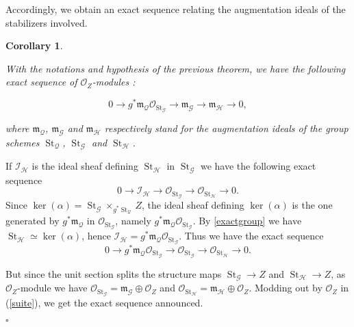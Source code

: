 \documentclass{amsart}
\newenvironment{demo}{{\flushleft \bf Proof~:}}{\hfill $\square$ \vspace{5mm}}
\newtheorem{coro}{Corollary}[section]
\theoremstyle{definition}
\theoremstyle{remark}
\begin{document}
Accordingly, we obtain an exact sequence relating the augmentation ideals of the stabilizers involved. 

\begin{coro}

\label{exactmodule}

With the notations and hypothesis of the previous theorem, we have the following exact sequence of ${{\mathcal O}}_Z$-modules : 

\[ 0 {\longrightarrow} g^*{{\mathfrak m}}_{{\mathcal Q}} {{\mathcal O}}_{\operatorname{St}_{{\mathcal G}}} {\longrightarrow} {{\mathfrak m}}_{{\mathcal G}} {\longrightarrow} {{\mathfrak m}}_{{\mathcal H}} {\longrightarrow} 0, \]

where ${{\mathfrak m}}_{{\mathcal Q}}$, ${{\mathfrak m}}_{{\mathcal G}}$ and ${{\mathfrak m}}_{{\mathcal H}}$ respectively stand for the augmentation ideals of the group schemes $\operatorname{St}_{{\mathcal Q}}$, $\operatorname{St}_{{\mathcal G}}$ and $\operatorname{St}_{{\mathcal H}}$. 

\end{coro}

\begin{demo}

If ${{\mathcal I}}_{{\mathcal H}}$ is the ideal sheaf defining $\operatorname{St}_{{\mathcal H}}$ in $\operatorname{St}_{{\mathcal G}}$ we have the following exact sequence \[ 0 {\longrightarrow} {{\mathcal I}}_{{\mathcal H}} {\longrightarrow} {{\mathcal O}}_{\operatorname{St}_{{\mathcal G}}} {\longrightarrow} {{\mathcal O}}_{\operatorname{St}_{{\mathcal H}}} {\longrightarrow} 0. \] Since $\ker(\alpha) = \operatorname{St}_{{\mathcal G}} \times_{g^*{\operatorname{St}_{{\mathcal Q}}}} Z$, the ideal sheaf  defining $\ker(\alpha)$ is the one generated by $g^*{{\mathfrak m}}_{{\mathcal Q}}$ in ${{\mathcal O}}_{\operatorname{St}_{{\mathcal G}}}$, namely $g^*{{\mathfrak m}}_{{\mathcal Q}} {{\mathcal O}}_{\operatorname{St}_{{\mathcal G}}}$. By \ref{exactgroup} we have $\operatorname{St}_{{\mathcal H}} \simeq \ker(\alpha)$, hence ${{\mathcal I}}_{{\mathcal H}} = g^*{{\mathfrak m}}_{{\mathcal Q}} {{\mathcal O}}_{\operatorname{St}_{{\mathcal G}}}$. Thus we have the exact sequence \[ 0 {\longrightarrow} g^*{{\mathfrak m}}_{{\mathcal Q}} {{\mathcal O}}_{\operatorname{St}_{{\mathcal G}}} {\longrightarrow} {{\mathcal O}}_{\operatorname{St}_{{\mathcal G}}} {\longrightarrow} {{\mathcal O}}_{\operatorname{St}_{{\mathcal H}}} {\longrightarrow} 0. \label{suite} \tag{1} \] 

But since the unit section splits the structure maps $\operatorname{St}_{{\mathcal G}} {\longrightarrow} Z$ and $\operatorname{St}_{{\mathcal H}} {\longrightarrow} Z$, as ${{\mathcal O}}_Z$-module we have ${{\mathcal O}}_{\operatorname{St}_{{\mathcal G}}} = {{\mathfrak m}}_{{\mathcal G}} \oplus {{\mathcal O}}_Z$ and ${{\mathcal O}}_{\operatorname{St}_{{\mathcal H}}} = {{\mathfrak m}}_{{\mathcal H}} \oplus {{\mathcal O}}_Z$. Modding out by ${{\mathcal O}}_Z$ in (\ref{suite}), we get the exact sequence announced. 

\end{demo}
\end{document}
